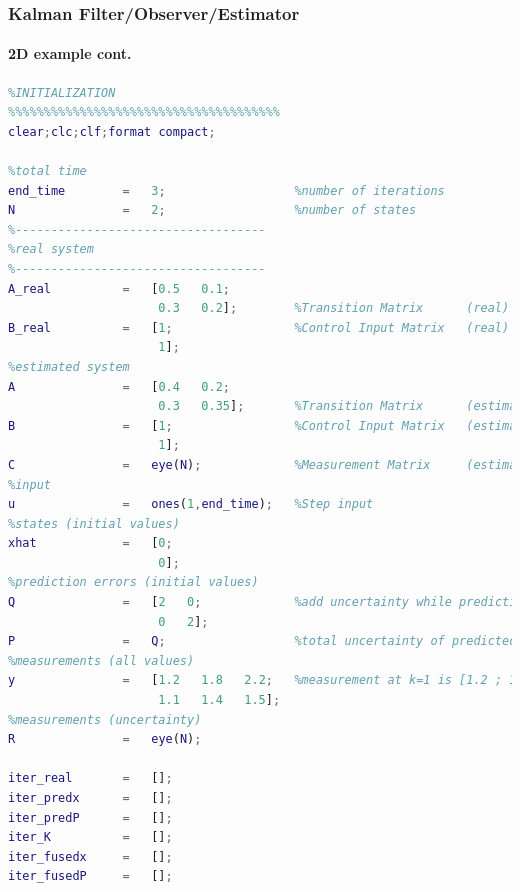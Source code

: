 \begin{frame}[fragile]\pw\Large
\frametitle{Kalman Filter/Observer/Estimator}
\framesubtitle{2D example \tiny cont.}

\tinyvvv \begin{lstlisting}[language=Matlab]
%%%%%%%%%%%%%%%%%%%%%%%%%%%%%%%%%%%%%%
%INITIALIZATION
%%%%%%%%%%%%%%%%%%%%%%%%%%%%%%%%%%%%%%
clear;clc;clf;format compact;

%total time
end_time        =   3;                  %number of iterations  
N               =   2;                  %number of states
%-----------------------------------
%real system
%-----------------------------------
A_real          =   [0.5   0.1;
                     0.3   0.2];        %Transition Matrix      (real)                                
B_real          =   [1;                 %Control Input Matrix   (real)
                     1];
%estimated system                                 
A               =   [0.4   0.2;
                     0.3   0.35];       %Transition Matrix      (estimated)
B               =   [1;                 %Control Input Matrix   (estimated)
                     1];
C               =   eye(N);             %Measurement Matrix     (estimated)
%input
u               =   ones(1,end_time);   %Step input
%states (initial values)
xhat            =   [0;
                     0];                
%prediction errors (initial values)
Q               =   [2   0;             %add uncertainty while predicting
                     0   2];                
P               =   Q;                  %total uncertainty of predicted state
%measurements (all values)
y               =   [1.2   1.8   2.2;   %measurement at k=1 is [1.2 ; 1.1], etc
                     1.1   1.4   1.5];
%measurements (uncertainty)
R               =   eye(N);             

iter_real       =   [];
iter_predx      =   [];   
iter_predP      =   [];   
iter_K          =   [];    
iter_fusedx     =   []; 
iter_fusedP     =   []; 
\end{lstlisting}
\end{frame}




